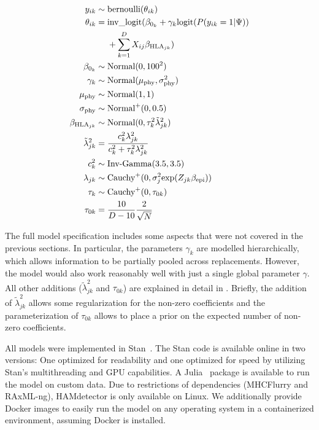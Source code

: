 \documentclass[fleqn,11pt]{SelfArx} %
\begin{document}
\begin{equation}
  \label{eq:full}
  \begin{aligned}
    y_{ik} &\sim \text{bernoulli}(\theta_{ik})\\
      \theta_{ik} &=
        \text{inv\_logit}(\beta_{0_{k}} + \gamma_{k}\text{logit}(P(y_{ik}=1|\Psi))\\
        \hspace{-6cm} &~~~~ +\sum_{k=1}^{D}X_{ij}\beta_{\text{HLA}_{jk}}) \\
    \beta_{0_{k}} &\sim \text{Normal}(0, 100^2)\\
    \gamma_{k} &\sim \text{Normal}(\mu_{\text{phy}}, \sigma_{\text{phy}}^2)\\
    \mu_{\text{phy}} &\sim \text{Normal}(1, 1)\\
    \sigma_{\text{phy}} &\sim \text{Normal}^{+}(0, 0.5)\\
    \beta_{\text{HLA}_{jk}} &\sim \text{Normal}(0, \tau_{k}^{2}\tilde{\lambda}^{2}_{jk})\\
    \tilde{\lambda}^{2}_{jk} &= \frac{c_{k}^{2}\lambda_{jk}^{2}}{c_{k}^{2} + \tau_{k}^{2}\lambda_{jk}^{2}} \\
    c_{k}^2 &\sim \text{Inv-Gamma}(3.5, 3.5)\\
    \lambda_{jk} &\sim \text{Cauchy}^{+}(0, \sigma_{j}^2\text{exp}(Z_{jk}\beta_{\text{epi}}))\\
    \tau_{k} &\sim \text{Cauchy}^{+}(0, \tau_{0k})\\
    \tau_{0k} &= \frac{10}{D-10}\frac{2}{\sqrt{N}}\\
  \end{aligned}
\end{equation}

The full model specification includes some aspects that were not covered in the previous sections. In particular, the parameters \(\gamma_{k}\) are modelled hierarchically, which allows information to be partially pooled across replacements. However, the model would also work reasonably well with just a single global parameter \(\gamma\). All other additions (\(\tilde{\lambda}_{jk}^{2}\) and \(\tau_{0k}\)) are explained in detail in \cite{Piironen2017}. Briefly, the addition of  \(\tilde{\lambda}_{jk}^{2}\) allows some regularization for the non-zero coefficients and the parameterization of \(\tau_{0k}\) allows to place a prior on the expected number of non-zero coefficients.

All models were implemented in Stan~\cite{Stan2021}. The Stan code is available online in two versions: One optimized for readability and one optimized for speed by utilizing Stan's multithreading and GPU capabilities.
A Julia~\cite{Bezanson2017} package is available to run the model on custom data. Due to restrictions of dependencies (MHCFlurry and RAxML-ng), HAMdetector is only available on Linux. We additionally provide Docker images to easily run the model on any operating system in a containerized environment, assuming Docker is installed. 
\end{document}
